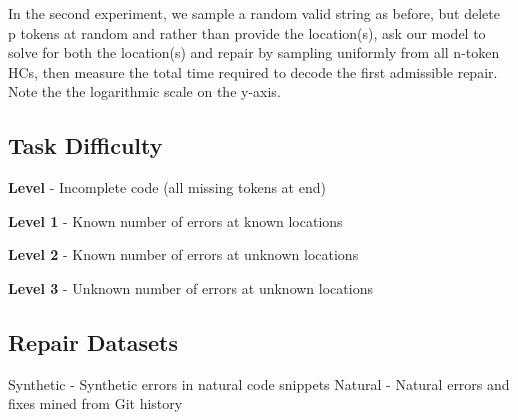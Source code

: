 \documentclass[sigplan,review,anonymous,acmsmall]{acmart}\settopmatter{printfolios=false,printccs=false,printacmref=false}
\begin{document}
    \noindent In the second experiment, we sample a random valid string as before, but delete p tokens at random and rather than provide the location(s), ask our model to solve for both the location(s) and repair by sampling uniformly from all n-token HCs, then measure the total time required to decode the first admissible repair. Note the the logarithmic scale on the y-axis.


    \subsection{Task Difficulty}

    \noindent\textbf{Level \textonehalf} - Incomplete code (all missing tokens at end)

    \noindent\textbf{Level 1} - Known number of errors at known locations

    \noindent\textbf{Level 2} - Known number of errors at unknown locations

    \noindent\textbf{Level 3} - Unknown number of errors at unknown locations

    \subsection{Repair Datasets}
    Synthetic - Synthetic errors in natural code snippets
    Natural - Natural errors and fixes mined from Git history
\end{document}
